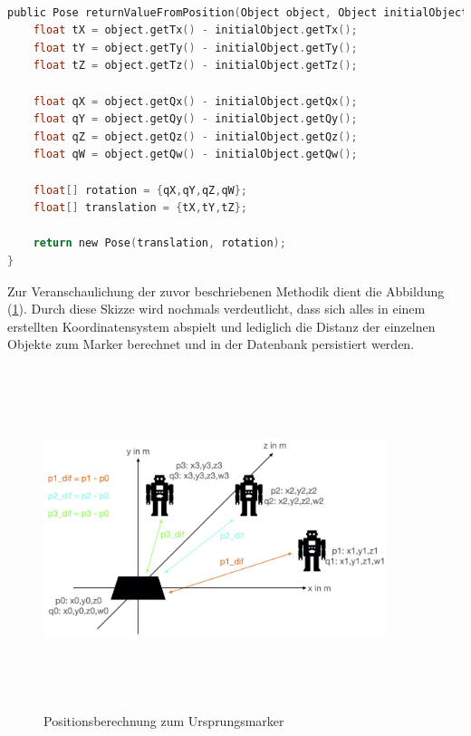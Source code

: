 \\
\begin{lstlisting}[language=C,
    frame=lines,           % Ein Rahmen um den Code (single for box, lines for top and bottom)
    xleftmargin=\parindent,  % Rahmen link von den Zahlen
    style=algoBericht,
    label={code:differencetoinitial},
    captionpos=b,           % Caption unter den Code setzen
caption={Berechnung der Distanz zwischen Marker und Ursprungspunkt}]
public Pose returnValueFromPosition(Object object, Object initialObject){
    float tX = object.getTx() - initialObject.getTx();
    float tY = object.getTy() - initialObject.getTy();
    float tZ = object.getTz() - initialObject.getTz();

    float qX = object.getQx() - initialObject.getQx();
    float qY = object.getQy() - initialObject.getQy();
    float qZ = object.getQz() - initialObject.getQz();
    float qW = object.getQw() - initialObject.getQw();

    float[] rotation = {qX,qY,qZ,qW};
    float[] translation = {tX,tY,tZ};

    return new Pose(translation, rotation);
}
\end{lstlisting}
Zur Veranschaulichung der zuvor beschriebenen Methodik dient die Abbildung (\ref{pic:differenztoinitial}). Durch diese Skizze wird nochmals verdeutlicht, dass 
sich alles in einem erstellten Koordinatensystem abspielt und lediglich die Distanz der einzelnen Objekte zum Marker berechnet und in der Datenbank persistiert 
werden.
\begin{figure}[hbt!]
    \centering
    \includegraphics[width=10cm,height=10cm,keepaspectratio]{4Umsetzung/Bilder/difcalc.jpeg}
    \caption{Positionsberechnung zum Ursprungsmarker}
    \label{pic:differenztoinitial}
\end{figure}
